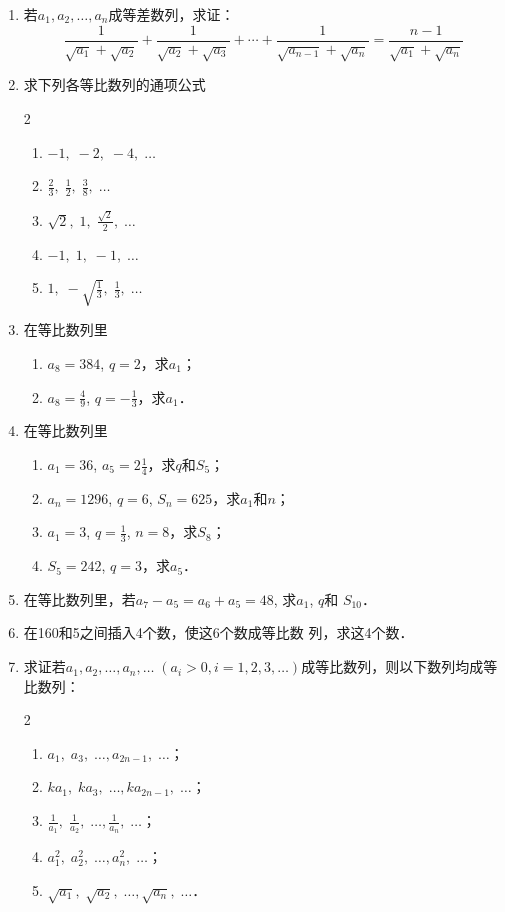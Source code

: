 \begin{enumerate}
\item 若$a_1,a_2,\ldots,a_n$成等差数列，求证：
\[\frac{1}{\sqrt{a_1}+\sqrt{a_2}}+\frac{1}{\sqrt{a_2}+\sqrt{a_3}}+\cdots +\frac{1}{\sqrt{a_{n-1}}+\sqrt{a_n}}=\frac{n-1}{\sqrt{a_1}+\sqrt{a_n}}\]

\item 求下列各等比数列的通项公式
\begin{multicols}{2}
\begin{enumerate}
    \item $-1,\;-2,\;-4,\;\ldots$
    \item $\frac{2}{3},\;\frac{1}{2},\;\frac{3}{8},\;\ldots$
    \item $\sqrt{2},\;1,\;\frac{\sqrt{2}}{2},\;\ldots$
    \item $-1,\;1,\;-1,\;\ldots$
    \item $1,\;-\sqrt{\frac{1}{3}},\;\frac{1}{3},\;\ldots$
\end{enumerate}
\end{multicols}

\item 在等比数列里
\begin{enumerate}
    \item $a_8=384$, $q=2$，求$a_1$；
    \item $a_8=\frac{4}{9}$, $q=-\frac{1}{3}$，求$a_1$．
\end{enumerate}

\item 在等比数列里
\begin{enumerate}
    \item $a_1=36$, $a_5=2\frac{1}{4}$，求$q$和$S_5$；
    \item $a_n=1296$, $q=6$, $S_n=625$，求$a_1$和$n$；
    \item $a_1=3$, $q=\frac{1}{3}$, $n=8$，求$S_8$；
    \item $S_5=242$, $q=3$，求$a_5$．
\end{enumerate}
\item 在等比数列里，若$a_7-a_5=a_6+a_5=48$, 求$a_1$, $q$和
$S_{10}$．
\item 在160和5之间插入4个数，使这6个数成等比数
列，求这4个数．
\item 求证若$a_1,a_2,\ldots,a_n,\ldots\; (a_i>0,i=1,2,3,
\ldots)$成等比数列，则以下数列均成等比数列：
\begin{multicols}{2}
\begin{enumerate}
    \item $a_1,\; a_3,\; \ldots, a_{2n-1},\; \ldots$；
    \item $ka_1,\; ka_3,\; \ldots, ka_{2n-1},\; \ldots$；
    \item $\frac{1}{a_1},\; \frac{1}{a_2},\; \ldots, \frac{1}{a_{n}},\; \ldots$；
    \item $a^2_1,\; a^2_2,\; \ldots, a^2_{n},\; \ldots$；
    \item $\sqrt{a_1},\; \sqrt{a_2},\; \ldots, \sqrt{a_n},\; \ldots$．
\end{enumerate}
\end{multicols}


\end{enumerate}

